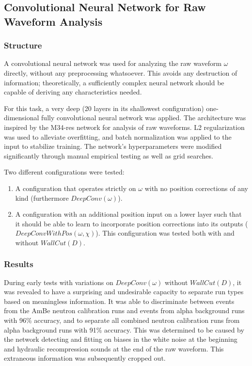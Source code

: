 \documentclass[10pt]{article}
\begin{document}
\subsection{Convolutional Neural Network for Raw Waveform Analysis}

\subsubsection{Structure}

A convolutional neural network was used for analyzing the raw waveform $\omega$ directly, without any preprocessing whatsoever. This avoids any destruction of information; theoretically, a sufficiently complex neural network should be capable of deriving any characteristics needed.

For this task, a very deep (20 layers in its shallowest configuration) one-dimensional fully convolutional neural network was applied. The architecture was inspired by the M34-res network \cite{verydeepconvnets} for analysis of raw waveforms. L2 regularization was used to alleviate overfitting, and batch normalization was applied to the input to stabilize training. The network's hyperparameters were modified significantly through manual empirical testing as well as grid searches.

Two different configurations were tested:
\begin{enumerate}
    \item A configuration that operates strictly on $\omega$ with no position corrections of any kind (furthermore $DeepConv(\omega)$).
    \item A configuration with an additional position input on a lower layer such that it should be able to learn to incorporate position corrections into its outputs ($DeepConvWithPos(\omega, \chi)$). This configuration was tested both with and without $WallCut(D)$.
\end{enumerate}

\subsubsection{Results}

During early tests with variations on $DeepConv(\omega)$ without $WallCut(D)$, it was revealed to have a surprising and undesirable capacity to separate run types based on meaningless information. It was able to discriminate between events from the AmBe neutron calibration runs and events from alpha background runs with 96\% accuracy, and to separate all combined neutron calibration runs from alpha background runs with 91\% accuracy. This was determined to be caused by the network detecting and fitting on biases in the white noise at the beginning and hydraulic recompression sounds at the end of the raw waveform. This extraneous information was subsequently cropped out.
\end{document}

